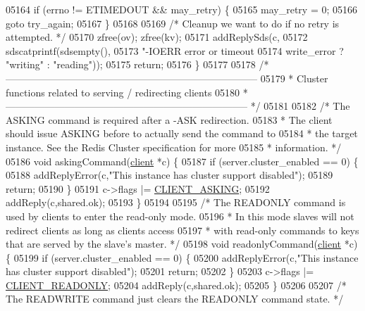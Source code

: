 \begin{DoxyCode}
{{{{{{{{{{{{{{{{{{{{{{{{{{{{{{{{{{{{{{{{{{{{{{{{{{{{{{{{{{{{{{{{{{{{{{{{{{{{{{{{{{{{{{{{{{{{{{{{{{{{{{{{{{{{05164     \textcolor{keywordflow}{if} (errno != ETIMEDOUT && may\_retry) \{
05165         may\_retry = 0;
05166         \textcolor{keywordflow}{goto} try\_again;
05167     \}
05168 
05169     \textcolor{comment}{/* Cleanup we want to do if no retry is attempted. */}
05170     zfree(ov); zfree(kv);
05171     addReplySds(c,
05172         sdscatprintf(sdsempty(),
05173             \textcolor{stringliteral}{"-IOERR error or timeout %
05174             write\_error ? \textcolor{stringliteral}{"writing"} : \textcolor{stringliteral}{"reading"}));
05175     \textcolor{keywordflow}{return};
05176 \}
05177 
05178 \textcolor{comment}{/* -----------------------------------------------------------------------------}
05179 \textcolor{comment}{ * Cluster functions related to serving / redirecting clients}
05180 \textcolor{comment}{ * -------------------------------------------------------------------------- */}
05181 
05182 \textcolor{comment}{/* The ASKING command is required after a -ASK redirection.}
05183 \textcolor{comment}{ * The client should issue ASKING before to actually send the command to}
05184 \textcolor{comment}{ * the target instance. See the Redis Cluster specification for more}
05185 \textcolor{comment}{ * information. */}
05186 \textcolor{keywordtype}{void} askingCommand(\hyperlink{structclient}{client} *c) \{
05187     \textcolor{keywordflow}{if} (server.cluster\_enabled == 0) \{
05188         addReplyError(c,\textcolor{stringliteral}{"This instance has cluster support disabled"});
05189         \textcolor{keywordflow}{return};
05190     \}
05191     c->flags |= \hyperlink{server_8h_a108ac316dfd847430daf3c97f28557d3}{CLIENT\_ASKING};
05192     addReply(c,shared.ok);
05193 \}
05194 
05195 \textcolor{comment}{/* The READONLY command is used by clients to enter the read-only mode.}
05196 \textcolor{comment}{ * In this mode slaves will not redirect clients as long as clients access}
05197 \textcolor{comment}{ * with read-only commands to keys that are served by the slave's master. */}
05198 \textcolor{keywordtype}{void} readonlyCommand(\hyperlink{structclient}{client} *c) \{
05199     \textcolor{keywordflow}{if} (server.cluster\_enabled == 0) \{
05200         addReplyError(c,\textcolor{stringliteral}{"This instance has cluster support disabled"});
05201         \textcolor{keywordflow}{return};
05202     \}
05203     c->flags |= \hyperlink{server_8h_a84ba0494755e2f4f0faf6017175b5e0a}{CLIENT\_READONLY};
05204     addReply(c,shared.ok);
05205 \}
05206 
05207 \textcolor{comment}{/* The READWRITE command just clears the READONLY command state. */}
}}}}}}}}}}}}}}}}}}}}}}}}}}}}}}}}}}}}}}}}}}}}}}}}}}}}}}}}}}}}}}}}}}}}}}}}}}}}}}}}}}}}}}}}}}}}}}}}}}}}}}}}}}}}}
\end{DoxyCode}
